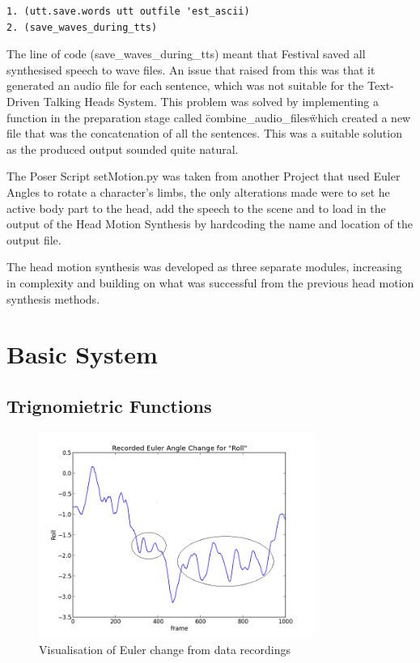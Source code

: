 \documentclass[bsc,frontabs,twoside,singlespacing,parskip]{infthesis}
\begin{document}
\begin{lstlisting}
1. (utt.save.words utt outfile 'est_ascii) 
2. (save_waves_during_tts)
\end{lstlisting}

The line of code (save\_waves\_during\_tts) meant that Festival saved all synthesised speech to wave files. An issue that raised from this was that it generated an audio file for each sentence, which was not suitable for the Text-Driven Talking Heads System. This problem was solved by implementing a function in the preparation stage called \"combine\_audio\_files\" which created a new file that was the concatenation of all the sentences. This was a suitable solution as the produced output sounded quite natural.

The Poser Script setMotion.py was taken from another Project that used Euler Angles to rotate a character's limbs, the only alterations made were to set he active body part to the head, add the speech to the scene and to load in the output of the Head Motion Synthesis by hardcoding the name and location of the output file.

The head motion synthesis was developed as three separate modules, increasing in complexity and building on what was successful from the previous head motion synthesis methods.

\section{Basic System} 

\subsection{Trignomietric Functions}

\begin{figure}
	\centering
	\includegraphics[width=0.8\textwidth]{euler_change.png}
	\caption{Visualisation of Euler change from data recordings}
\end{figure}
\end{document}
